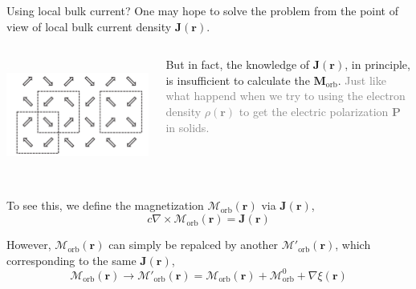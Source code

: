 \documentclass{beamer}
\begin{document}
    \begin{frame}{Using local bulk current?}
      One may hope to solve the problem from the point of view of local bulk current density \(\bm{J}(\bm{r})\).
      
      \begin{columns}
        \begin{column}{0.3\textwidth}
          \textcolor{white}{.}
          \includegraphics[width=\textwidth]{figure/MinJ.png}
        \end{column}
        \begin{column}{0.7\textwidth}    
          \begin{block}{}
            But in fact, the knowledge of \(\bm{J}(\bm{r})\), in principle, is insufficient to calculate the \(\bm{M}_{\text{orb}}\). \textcolor{gray}{Just like what happend when we try to using the electron density \(\rho(\bm{r})\) to get the electric polarization \(\bm{P}\) in solids.}
          \end{block}
        \end{column}
      \end{columns}
      \ \\
     
      To see this, we define the magnetization \(\bm{\mathcal{M}}_{\text{orb}}(\bm{r})\) via \(\bm{J}(\bm{r})\), 
      \begin{equation}
        c\nabla\times\bm{\mathcal{M}}_{\text{orb}}(\bm{r}) = \bm{J}(\bm{r})
      \end{equation}

      However, \(\bm{\mathcal{M}}_{\text{orb}}(\bm{r})\) can simply be repalced by another \(\bm{\mathcal{M}}'_{\text{orb}}(\bm{r})\), which corresponding to the same \(\bm{J}(\bm{r})\),
      \begin{equation}
        \bm{\mathcal{M}}_{\text{orb}}(\bm{r}) \to \bm{\mathcal{M}}'_{\text{orb}}(\bm{r}) = \bm{\mathcal{M}}_{\text{orb}}(\bm{r}) + \bm{\mathcal{M}}_{\text{orb}}^0 + \nabla\xi(\bm{r})
      \end{equation}
    \end{frame}
\end{document}
